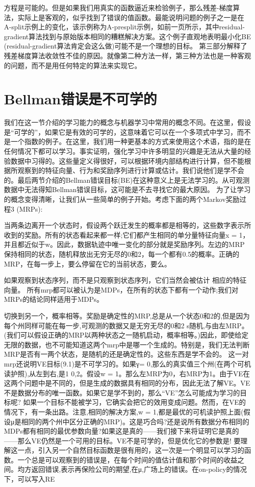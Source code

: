 方程是可能的。但是如果我们用真实的函数逼近来检验例子，那么残差-梯度算法，实际上是客观的，似乎找到了错误的值函数。最能说明问题的例子之一是在A-split示例上的变化，该示例称为A-presplit示例，如前一页所示，其中residual-gradient算法找到与原始版本相同的糟糕解决方案。这个例子直观地表明最小化BE (residual-gradient算法肯定会这么做)可能不是一个理想的目标。
第三部分解释了残差梯度算法收敛性不佳的原因。就像第二种方法一样，第三种方法也是一种客观的问题，而不是用任何特定的算法来实现它。


\section{Bellman错误是不可学的}

我们在这一节介绍的学习能力的概念与机器学习中常用的概念不同。在这里，假设是“可学的”，如果它是有效的可学的，这意味着它可以在一个多项式中学习，而不是一个指数的例子。在这里，我们用一种更基本的方式来使用这个术语，指的是在任何情况下都可以学习。事实证明，强化学习中许多明显的兴趣是无法从大量的经验数据中习得的。这些量定义得很好，可以根据环境内部结构进行计算，但不能根据所观察到的特征向量、行为和奖励序列进行计算或估计。我们说他们是学不会的。最后两节介绍的Bellman错误目标(BE)在这种意义上是无法学习的。从可观测数据中无法得知Bellman错误目标，这可能是不去寻找它的最大原因。
为了让学习的概念变得清晰，让我们从一些简单的例子开始。考虑下面的两个Markov奖励过程3 (MRPs):
 
当两条边离开一个状态时，假设两个跃迁发生的概率都是相等的，这些数字表示所收到的奖励。所有的状态看起来都一样;它们都产生相同的单分量特征向量x = 1，并且都近似于w。因此，数据轨迹中唯一变化的部分就是奖励序列。左边的MRP保持相同的状态，随机释放出无穷无尽的0和2，每一个都有0.5的概率。正确的MRP，在每一步上，要么停留在它的当前状态，要么。

如果观察到状态序列，而不是只观察到状态序列，它们当然会被估计
相应的特征向量。
所有mrp都可以被认为是MDPs，在所有的状态下都有一个动作;我们对MRPs的结论同样适用于MDPs。

切换到另一个，概率相等。奖励是确定性的MRP,总是从一个状态0和2的,但是因为每个州同样可能在每一步,可观测的数据又是无穷无尽的0和2 s随机,与由左MRP。(我们可以假设正确的MRP以两种状态之一随机启动，概率相等。)因此，即使给定无限的数据，也不可能知道这两个mrp中是哪一个生成的。特别是，我们无法判断MRP是否有一两个状态，是随机的还是确定性的。这些东西是学不会的。
这一对mrp还说明VE目标(9.1)是不可学习的。如果γ= 0,那么的真实值三个州(在两个可机读护照),从左到右,是1 0,2。假设w = 1。那么左MRP为0，右MRP为1。由于VE在这两个问题中是不同的，但是生成的数据具有相同的分布，因此无法了解VE。VE不是数据分布的唯一函数。如果它是学不到的，那么“VE”怎么可能成为学习的目标呢?
如果一个目标不能被学习，它确实会把它的效用变成问题。然而，在VE的情况下，有一条出路。注意,相同的解决方案,w = 1,都是最优的可机读护照上面(假设μ是相同的两个州中区分正确的MRP)。这是巧合吗?还是说所有数据分布相同的MDPs都有相同的最优参数向量?如果这是真的——我们接下来将证明它是真的——那么VE仍然是一个可用的目标。VE不是可学的，但是优化它的参数是!
要理解这一点，引入另一个自然目标函数是很有用的，这一次是一个明显可以学习的函数。一个总是可以观察到的错误是，在每个时间的值估计值和那个时间的收益之间。均方返回错误,表示再保险公司的期望,在μ,广场上的错误。在on-policy的情况下，可以写入RE
 
